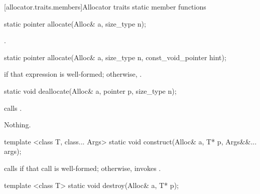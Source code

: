[allocator.traits.members]{Allocator traits static member functions}

%
%
\begin{itemdecl}
static pointer allocate(Alloc& a, size_type n);
\end{itemdecl}

\begin{itemdescr}
\pnum
\returns {}.
\end{itemdescr}

%
%
\begin{itemdecl}
static pointer allocate(Alloc& a, size_type n, const_void_pointer hint);
\end{itemdecl}

\begin{itemdescr}
\pnum
\returns {} if that expression is well-formed; otherwise, .
\end{itemdescr}

%
%
\begin{itemdecl}
static void deallocate(Alloc& a, pointer p, size_type n);
\end{itemdecl}

\begin{itemdescr}
\pnum
\effects calls .

\pnum
\throws Nothing.
\end{itemdescr}

%
\begin{itemdecl}
template <class T, class... Args>
  static void construct(Alloc& a, T* p, Args&&... args);
\end{itemdecl}

\begin{itemdescr}
\pnum
\effects calls 
if that call is well-formed;
otherwise, invokes .
\end{itemdescr}

%
\begin{itemdecl}
template <class T>
  static void destroy(Alloc& a, T* p);
\end{itemdecl}

